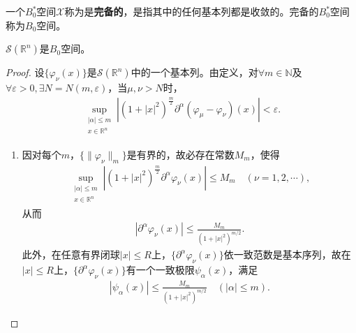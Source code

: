 \documentclass[../../main.tex]{subfiles}%
\begin{document}
\begin{definition}
一个$B_0^*$空间$\mathscr{X}$称为是\textbf{完备的}，是指其中的任何基本列都是收敛的。完备的$B_0^*$空间称为$B_0$空间。
\end{definition}

\begin{proposition}
$\mathscr{S}(\mathbb{R}^n)$是$B_0$空间。
\end{proposition}
\begin{proof}
设$\{\varphi_\nu(x)\}$是$\mathscr{S}(\mathbb{R}^n)$中的一个基本列。由定义，对$\forall m\in\mathbb{N}$及$\forall\varepsilon>0,\exists N=N(m,\varepsilon)$，当$\mu,\nu>N$时，
\begin{align}
\sup\limits_{\substack{|\alpha|\leqslant m\\x\in\mathbb{R}^n}}\left|(1+|x|^2)^{\frac{m}{2}}\partial^\alpha(\varphi_\mu-\varphi_\nu)(x)\right|<\varepsilon.\label{eq:4-2-2}
\end{align}
\begin{enumerate}[(1)]
\item 因对每个$m$，$\{\|\varphi_\nu\|_m\}$是有界的，故必存在常数$M_m$，使得
\begin{align*}
\sup\limits_{\substack{|\alpha|\leqslant m\\x\in\mathbb{R}^n}}\left|(1+|x|^2)^{\frac{m}{2}}\partial^\alpha\varphi_\nu(x)\right|\leqslant M_m\quad(\nu=1,2,\cdots),
\end{align*}
从而
\begin{align}
|\partial^\alpha\varphi_\nu(x)|\leqslant\frac{M_m}{(1+|x|^2)^{m/2}}.\label{eq:4-2-3}
\end{align}
此外，在任意有界闭球$|x|\leqslant R$上，$\{\partial^\alpha\varphi_\nu(x)\}$依一致范数是基本序列，故在$|x|\leqslant R$上，$\{\partial^\alpha\varphi_\nu(x)\}$有一个一致极限$\psi_\alpha(x)$，满足
\begin{align}
|\psi_\alpha(x)|\leqslant\frac{M_m}{(1+|x|^2)^{m/2}}\quad(|\alpha|\leqslant m).\label{eq:4-2-4}
\end{align}


\end{enumerate}
\end{proof}
\end{document}
